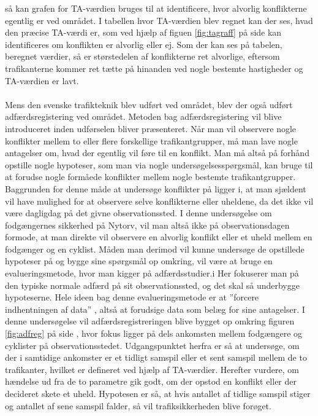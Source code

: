 så kan grafen for TA-værdien bruges til at identificere, hvor alvorlig konflikterne egentlig er ved området. I tabellen hvor TA-værdien blev regnet kan der ses, hvad den præcise TA-værdi er, som ved hjælp af figuen \cref{fig:tagraff} på side \pageref{fig:tagraff} kan identificeres om konflikten er alvorlig eller ej.
Som der kan ses på tabelen, beregnet værdier, så er størstedelen af konflikterne ret alvorlige, eftersom trafikanterne kommer ret tætte på hinanden ved nogle bestemte hastigheder og TA-værdien er lavt.
~\\\\
Mens den svenske trafikteknik blev udført ved området, blev der også udført adfærdsregistering ved området. Metoden bag adfærdsregistering vil blive introduceret inden udførselen bliver præsenteret.
Når	man	vil	observere nogle	konflikter mellem to eller flere	forskellige trafikantgrupper,	må man lave	nogle antagelser	om, hvad	 der egentlig vil føre til en konflikt. Man må altså	på	forhånd	opstille nogle hypoteser, som man via nogle undersøgelsesspørgsmål, kan bruge til	at forudse nogle	formåede	konflikter mellem nogle bestemte	trafikantgrupper.	Baggrunden for denne	måde at	undersøge konflikter	på ligger i,	at man sjældent 	vil	have	mulighed	 for at	observere selve konflikterne	eller uheldene, da det ikke	vil	være	 dagligdag på	 det	 givne observationssted.	I denne	undersøgelse om	fodgængernes sikkerhed på	Nytorv,	vil man altså ikke på observationsdagen formode,	at man direkte vil observere en alvorlig konflikt eller	et uheld mellem	en fodgænger og	en cyklist.	Måden man derimod	vil	kunne undersøge	de opstillede hypoteser på og bygge sine	spørgsmål op omkring, vil	være	at bruge en	evalueringsmetode, hvor	man	kigger på adfærdsstudier.i Her fokuserer	man	på den typiske normale adfærd på	sit observationssted, og	det skal så	underbygge	hypoteserne. Hele ideen bag denne evalueringsmetode er at ”forcere indhentningen af data”	\autocite{adf},	altså at forudsige data	som	belæg for sine antagelser.
I denne undersøgelse vil	adfærdsregistreringen blive bygget op omkring	figuren \cref{fig:adfreg} på side \pageref{fig:adfreg},
hvor fokus ligger på dels ankomsten mellem fodgængere	 og cyklister på observationsstedet. Udgangspunktet herfra er så at	undersøge, om	der i samtidige ankomster er et tidligt samspil eller	et sent samspil mellem de to trafikanter, hvilket er defineret ved hjælp af TA-værdier.
Herefter vurdere, om hændelse ud fra	de to parametre gik godt, om	der	opstod en konflikt	eller der decideret skete et	uheld. Hypotesen er	så,	at hvis	antallet af	tidlige samspil stiger og antallet af sene samspil falder, så vil trafiksikkerheden blive forøget.
